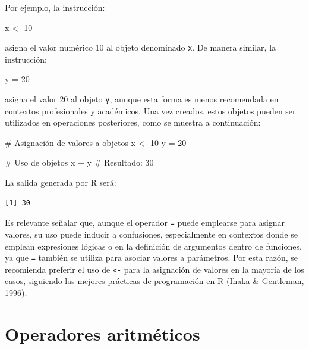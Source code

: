 \documentclass[
  spanish,
  a4paper,
  DIV=11,
  numbers=noendperiod,
  onepage,
  openany]{scrreprt}
\newenvironment{Shaded}{\begin{snugshade}}{\end{snugshade}}
\newcommand{\CommentTok}[1]{\textcolor[rgb]{0.37,0.37,0.37}{#1}}
\newcommand{\DecValTok}[1]{\textcolor[rgb]{0.68,0.00,0.00}{#1}}
\newcommand{\NormalTok}[1]{\textcolor[rgb]{0.00,0.23,0.31}{#1}}
\newcommand{\OtherTok}[1]{\textcolor[rgb]{0.00,0.23,0.31}{#1}}
\newcommand{\SpecialCharTok}[1]{\textcolor[rgb]{0.37,0.37,0.37}{#1}}
\begin{document}
Por ejemplo, la instrucción:

\begin{Shaded}
\begin{Highlighting}[]
\NormalTok{x }\OtherTok{\textless{}{-}} \DecValTok{10}          
\end{Highlighting}
\end{Shaded}

asigna el valor numérico 10 al objeto denominado \texttt{x}. De manera
similar, la instrucción:

\begin{Shaded}
\begin{Highlighting}[]
\NormalTok{y }\OtherTok{=} \DecValTok{20}
\end{Highlighting}
\end{Shaded}

asigna el valor 20 al objeto \texttt{y}, aunque esta forma es menos
recomendada en contextos profesionales y académicos. Una vez creados,
estos objetos pueden ser utilizados en operaciones posteriores, como se
muestra a continuación:

\begin{Shaded}
\begin{Highlighting}[]
\CommentTok{\# Asignación de valores a objetos}
\NormalTok{x }\OtherTok{\textless{}{-}} \DecValTok{10}          
\NormalTok{y }\OtherTok{=} \DecValTok{20}           

\CommentTok{\# Uso de objetos}
\NormalTok{x }\SpecialCharTok{+}\NormalTok{ y    }\CommentTok{\# Resultado: 30}
\end{Highlighting}
\end{Shaded}

La salida generada por R será:

\begin{verbatim}
[1] 30
\end{verbatim}

Es relevante señalar que, aunque el operador \texttt{=} puede emplearse
para asignar valores, su uso puede inducir a confusiones, especialmente
en contextos donde se emplean expresiones lógicas o en la definición de
argumentos dentro de funciones, ya que \texttt{=} también se utiliza
para asociar valores a parámetros. Por esta razón, se recomienda
preferir el uso de \texttt{\textless{}-} para la asignación de valores
en la mayoría de los casos, siguiendo las mejores prácticas de
programación en R (Ihaka \& Gentleman, 1996).

\section{Operadores aritméticos}\label{operadores-aritmuxe9ticos}
\end{document}
